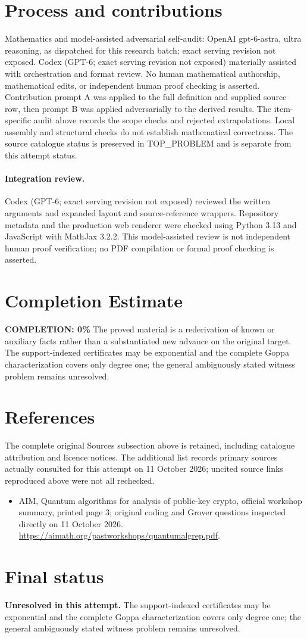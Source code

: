 \documentclass[11pt]{article}
\begin{document}
\section{Process and contributions}
Mathematics and model-assisted adversarial self-audit: OpenAI gpt-6-astra, ultra reasoning, as dispatched for this research batch; exact serving revision not exposed. Codex (GPT-6; exact serving revision not exposed) materially assisted with orchestration and format review. No human mathematical authorship, mathematical edits, or independent human proof checking is asserted.
Contribution prompt A was applied to the full definition and supplied source row, then prompt B was applied adversarially to the derived results. The item-specific audit above records the scope checks and rejected extrapolations. Local assembly and structural checks do not establish mathematical correctness. The source catalogue status is preserved in TOP\_PROBLEM and is separate from this attempt status.
\paragraph{Integration review.} Codex (GPT-6; exact serving revision not exposed) reviewed the written arguments and expanded layout and source-reference wrappers. Repository metadata and the production web renderer were checked using Python 3.13 and JavaScript with MathJax 3.2.2. This model-assisted review is not independent human proof verification; no PDF compilation or formal proof checking is asserted.

\section{Completion Estimate}
\noindent\textbf{COMPLETION: 0\%}
The proved material is a rederivation of known or auxiliary facts rather than a substantiated new advance on the original target. The support-indexed certificates may be exponential and the complete Goppa characterization covers only degree one; the general ambiguously stated witness problem remains unresolved.
\section{References}
The complete original Sources subsection above is retained, including catalogue attribution and licence notices. The additional list records primary sources actually consulted for this attempt on 11 October 2026; uncited source links reproduced above were not all rechecked.
\begin{itemize}
\item AIM, Quantum algorithms for analysis of public-key crypto, official workshop summary, printed page 3; original coding and Grover questions inspected directly on 11 October 2026. \url{https://aimath.org/pastworkshops/quantumalgrep.pdf}.
\end{itemize}
\section{Final status}
\textbf{Unresolved in this attempt.} The support-indexed certificates may be exponential and the complete Goppa characterization covers only degree one; the general ambiguously stated witness problem remains unresolved.
\end{document}
